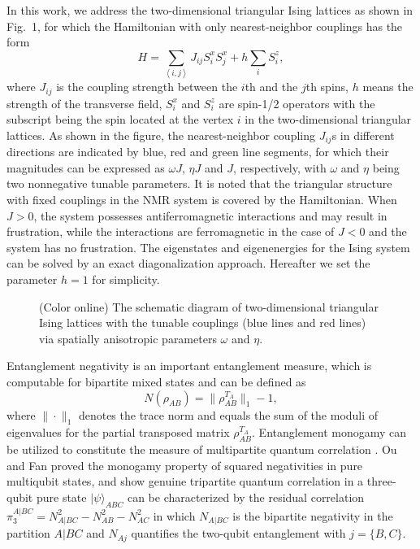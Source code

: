 \documentclass[pra,aps,twocolumn,showpacs]{revtex4}
\newcommand{\ket}[1]{|#1\rangle}
\begin{document}
In this work, we address the two-dimensional triangular Ising lattices as shown in Fig.~1, for which the Hamiltonian with only nearest-neighbor couplings has the form
\begin{equation}\label{1}
H=\sum_{\left\langle i,j\right\rangle } J_{ij}S_i^x S_j^x+h \sum_{i} S_i^z,
\end{equation}
where $J_{ij}$ is the coupling strength between the $i$th and the $j$th spins, $h$ means the strength of the transverse field, $S_i^x$ and $S_i^z$ are spin-1/2 operators with the subscript being the spin located at the vertex  $i$ in the two-dimensional triangular lattices. As shown in the figure, the nearest-neighbor coupling $J_{ij}$s in different directions are indicated by blue, red and green line segments,  for which their magnitudes can be expressed as $\omega J$, $\eta J$ and $J$, respectively, with $\omega$ and $\eta$ being two nonnegative tunable parameters. It is noted that the triangular structure with fixed couplings in the NMR system \cite{rkrao13pra} is covered by the Hamiltonian. When $J>0$, the system possesses antiferromagnetic interactions and may result in frustration, while the interactions are ferromagnetic in the case of $J<0$ and the system has no frustration. The eigenstates and eigenenergies for the Ising system can be solved by an exact diagonalization approach. Hereafter we set the parameter $h=1$ for simplicity.

\begin{figure}
	\caption{(Color online) The schematic diagram of two-dimensional triangular Ising lattices with the tunable couplings (blue lines and red lines) via spatially anisotropic parameters $\omega$ and $\eta$.}
\end{figure}


Entanglement negativity \cite{vidal02pra,plenio05prl,zyc98pra} is an important entanglement measure, which is computable for bipartite mixed states and can be defined as \cite{vidal02pra}
\begin{equation}\label{2}
N(\rho_{AB})=\|\rho_{AB}^{T_A}\|_1-1,
\end{equation}
where $\|\cdot\|_1$ denotes the trace norm and equals the sum of the moduli of eigenvalues for the partial transposed matrix $\rho_{AB}^{T_A}$. Entanglement monogamy can be utilized to constitute the measure of multipartite quantum correlation \cite{horod09rmp}. Ou and Fan proved the monogamy property of squared negativities in pure multiqubit states, and show genuine tripartite quantum correlation in a three-qubit pure state $\ket{\psi}_{ABC}$ can be characterized by the residual correlation $\pi_3^{A|BC}= N_{A|BC}^2-N_{AB}^2-N_{AC}^2$ \cite{fan07pra} in which $N_{A|BC}$ is the bipartite negativity in the partition $A|BC$ and $N_{Aj}$ quantifies the two-qubit entanglement with $j=\{B, C\}$.
\end{document}
